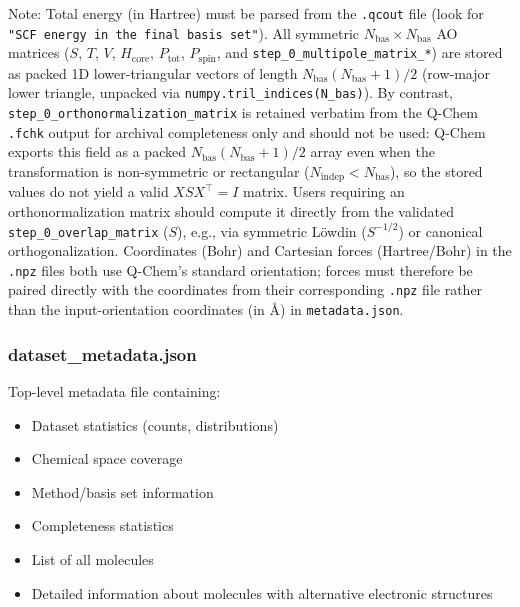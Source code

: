 \documentclass[fleqn,10pt]{article}
\begin{document}
{\begin{itemize}
\end{itemize}
\par}

Note: Total energy (in Hartree) must be parsed from the \texttt{.qcout} file (look for \texttt{"SCF   energy in the final basis set"}). All symmetric $N_{\mathrm{bas}} \times N_{\mathrm{bas}}$ AO matrices ($S$, $T$, $V$, $H_{\mathrm{core}}$, $P_{\mathrm{tot}}$, $P_{\mathrm{spin}}$, and \texttt{step\_\allowbreak{}0\_\allowbreak{}multipole\_\allowbreak{}matrix\_\allowbreak{}*}) are stored as packed 1D lower-triangular vectors of length $N_{\mathrm{bas}}(N_{\mathrm{bas}}+1)/2$ (row-major lower triangle, unpacked via \texttt{numpy.tril\_\allowbreak{}indices(N\_\allowbreak{}bas)}). By contrast, \texttt{step\_\allowbreak{}0\_\allowbreak{}orthonormalization\_\allowbreak{}matrix} is retained verbatim from the Q-Chem \texttt{.fchk} output for archival completeness only and should not be used: Q-Chem exports this field as a packed $N_{\mathrm{bas}}(N_{\mathrm{bas}}+1)/2$ array even when the transformation is non-symmetric or rectangular ($N_{\mathrm{indep}} < N_{\mathrm{bas}}$), so the stored values do not yield a valid $X S X^{\top} = I$ matrix. Users requiring an orthonormalization matrix should compute it directly from the validated \texttt{step\_\allowbreak{}0\_\allowbreak{}overlap\_\allowbreak{}matrix} ($S$), e.g., via symmetric L\"owdin ($S^{-1/2}$) or canonical orthogonalization. Coordinates (Bohr) and Cartesian forces (Hartree/Bohr) in the \texttt{.npz} files both use Q-Chem's standard orientation; forces must therefore be paired directly with the coordinates from their corresponding \texttt{.npz} file rather than the input-orientation coordinates (in \AA{}) in \texttt{metadata.json}.

\subsubsection*{dataset\_metadata.json}

Top-level metadata file containing:
\begin{itemize}
\item Dataset statistics (counts, distributions)
\item Chemical space coverage
\item Method/basis set information
\item Completeness statistics
\item List of all molecules
\item Detailed information about molecules with alternative electronic structures
\end{itemize}
\end{document}
